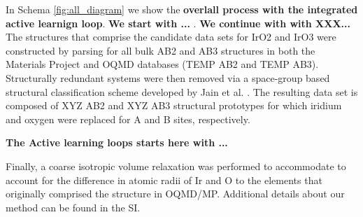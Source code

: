 


In Schema \ref{fig:all_diagram} we show the {\bf overlall process with the integrated active learnign loop}. {\bf We start with ...} .  {\bf We continue with  with XXX...}
The structures that comprise the candidate data sets for IrO2 and IrO3 were constructed by parsing for all bulk AB2 and AB3 structures in both the Materials Project\cite{Jain2013} and OQMD\cite{Kirklin2015} databases (TEMP AB2 and TEMP AB3).
%
Structurally redundant systems were then removed via a space-group based structural classification scheme developed by Jain et al. \cite{Jain2018}.
%
The resulting data set is composed of XYZ AB2 and XYZ AB3 structural prototypes for which iridium and oxygen were replaced for A and B sites, respectively.
%

{\bf The Active learning loops starts here with ...}

Finally, a coarse isotropic volume relaxation was performed to accommodate to account for the difference in atomic radii of Ir and O to the elements that originally comprised the structure in OQMD/MP.
%
 Additional details about our method can be found in the SI.


